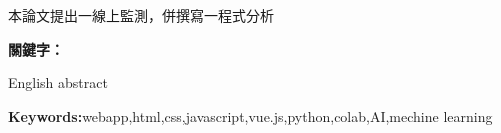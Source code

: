 \begin{abstractzh}
本論文提出一線上監測，併撰寫一程式分析

\bigbreak
\noindent \textbf{關鍵字：}{\, \makeatletter \@keywordszh \makeatother}
\end{abstractzh}

\begin{abstracten}
English abstract

\bigbreak
\noindent \textbf{Keywords:}{webapp,html,css,javascript,vue.js,python,colab,AI,mechine learning\makeatletter \makeatother}
\end{abstracten}

\begin{comment}
\category{I2.10}{Computing Methodologies}{Artificial Intelligence --
Vision and Scene Understanding} \category{H5.3}{Information
Systems}{Information Interfaces and Presentation (HCI) -- Web-based
Interaction.}

\terms{Design, Human factors, Performance.}

\keywords{Region of interest, Visual attention model, Web-based
games, Benchmarks.}
\end{comment}
